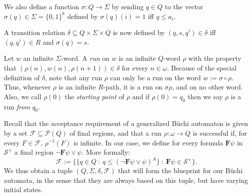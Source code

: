\documentclass{article}
\newcommand{\F}{\mathbf{F}}
\newcommand{\cF}{\mathcal{F}}
\renewcommand{\S}{\mathcal{S}}
\begin{document}
We also define a function $\sigma \colon Q \to \Sigma$ by sending $q \in Q$ to
the vector $\sigma(q) \in \Sigma = \{0,1\}^k$ defined by $\sigma(q)(i) = 1$ iff
$q \leq a_i$.

A transition relation $\delta \subseteq Q \times \Sigma \times Q$ is now
defined by $(q, s, q') \in \delta$ iff $(q, q') \in R$ and $\sigma(q) = s$. 

Let $w$ an infinite $\Sigma$-word. A \emph{run} on $w$ is an infinite $Q$-word
$\rho$ with the property that $(\rho(n), w(n), \rho(n+1)) \in \delta$ for every
$n \in \omega$. Because of the special definition of $\delta$, note that any run
$\rho$ can only be a run on the word $w := \sigma \circ \rho$. Thus, whenever
$\rho$ is an infinite $R$-path, it is a run on $\sigma \rho$, and on no other
word.
Also, we call $\rho(0)$
the \emph{starting point} of $\rho$ and if $\rho(0) = q_0$ then we say $\rho$ is
a run \emph{from} $q_0$.

Recall that the acceptance requirement of a generalized Büchi automaton is given
by a set $\cF \subseteq \mathcal{P}(Q)$ of final regions, and  that a run $\rho
\colon \omega \to Q$ is successful if, for every $F \in \cF$, $\rho^{-1}(F)$ is
infinite. In our case, we define for every formula $\F \psi$ in $\S^+$ a final
region $\neg \F \psi \vee \psi$. More formally:
%
\[ \cF := \{ \{q \in Q \ \colon \ q \leq (\neg \F \psi \vee \psi)^A \} \ \colon
\ \F \psi \in \S^+ \}.\]
%
We thus obtain a tuple $(Q, \Sigma, \delta, \cF)$ that will form the blueprint
for our Büchi automata, in the sense that they are always based on this tuple,
but have varying initial states.
\end{document}
